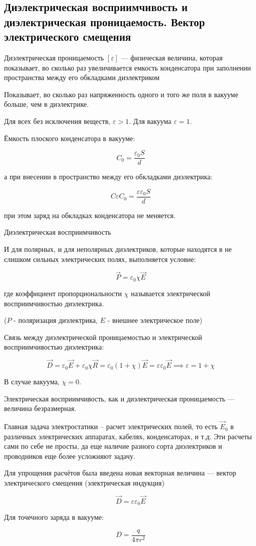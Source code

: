 \subsection{Диэлектрическая восприимчивость и диэлектрическая проницаемость. Вектор электрического смещения}

\begin{definition}
    Диэлектрическая проницаемость $[\varepsilon]$ — физическая величина, которая показывает, во сколько раз увеличивается 
    емкость конденсатора при заполнении пространства между его обкладками диэлектриком 

    Показывает, во сколько раз напряженность одного и того же поля в вакууме больше, чем в диэлектрике.

    Для всех без исключения веществ, $\varepsilon>1$. Для вакуума $\varepsilon=1$.
\end{definition}

Ёмкость плоского конденсатора в вакууме:

$$
C_0=\frac{\varepsilon_0S}{d}
$$

а при внесении в пространство между его обкладками диэлектрика:

$$
C\varepsilon C_0=\frac{\varepsilon\varepsilon_0S}{d}
$$

при этом заряд на обкладках конденсатора не меняется.

\begin{definition}
    Диэлектрическая восприимчивость

    И для полярных, и для неполярных диэлектриков, которые находятся в не слишком сильных электрических полях, выполняется условие:

    $$
    \vec P=\varepsilon_0\chi\vec E
    $$
\end{definition}

где коэффициент пропорциональности $\chi$ называется электрической восприимчивостью диэлектрика.

($P$ - поляризация диэлектрика, $E$ - внешнее электрическое поле)

\begin{remark}
    Связь между диэлектрической проницаемостью и электрической восприимчивостью диэлектрика:
\end{remark}

$$
\vec D=\varepsilon_0\vec E+\varepsilon_0\chi\vec R=\varepsilon_0(1+\chi)\vec E=\varepsilon\varepsilon_0\vec E \implies \varepsilon = 1+ \chi
$$

В случае вакуума, $\chi=0$.

Электрическая восприимчивость, как и диэлектрическая проницаемость — величина безразмерная.

Главная задача электростатики – расчет электрических полей, то есть $\vec E_0$ в различных электрических аппаратах, кабелях, конденсаторах, и т.д. Эти расчеты сами по себе не просты, да еще наличие разного сорта диэлектриков и проводников еще более усложняют задачу.

Для упрощения расчётов была введена новая векторная величина — вектор электрического смещения (электрическая индукция)

$$
\vec D=\varepsilon\varepsilon_0\vec E
$$

Для точечного заряда в вакууме:

$$
D=\frac{q}{4\pi r^2}
$$